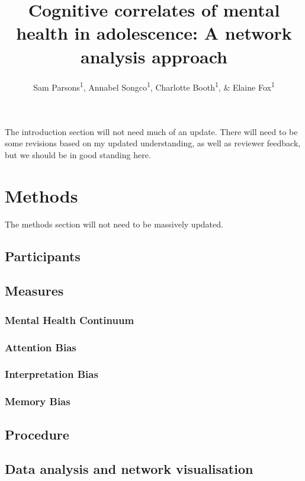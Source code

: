 \documentclass[man,floatsintext]{apa6}
\title{Cognitive correlates of mental health in adolescence: A network analysis
approach}
\author{Sam Parsons\textsuperscript{1}, Annabel Songco\textsuperscript{1},
Charlotte Booth\textsuperscript{1}, \& Elaine Fox\textsuperscript{1}}
\date{}
\affiliation{
\vspace{0.5cm}
\textsuperscript{1} University of Oxford}
\begin{document}
\maketitle

The introduction section will not need much of an update. There will
need to be some revisions based on my updated understanding, as well as
reviewer feedback, but we should be in good standing here.

\section{Methods}\label{methods}

The methods section will not need to be massively updated.

\subsection{Participants}\label{participants}

\subsection{Measures}\label{measures}

\subsubsection{Mental Health Continuum}\label{mental-health-continuum}

\subsubsection{Attention Bias}\label{attention-bias}

\subsubsection{Interpretation Bias}\label{interpretation-bias}

\subsubsection{Memory Bias}\label{memory-bias}

\subsection{Procedure}\label{procedure}

\subsection{Data analysis and network
visualisation}\label{data-analysis-and-network-visualisation}
\end{document}
